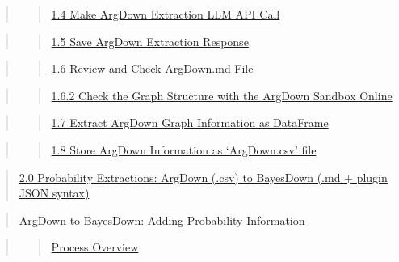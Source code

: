 \documentclass[
  letterpaper,
]{book}
\begin{document}
\begin{quote}
\begin{quote}
\hyperref[scrollTo=i5xsDYnsAWC4]{1.4 Make ArgDown Extraction LLM API
Call}
\end{quote}
\end{quote}

\begin{quote}
\begin{quote}
\hyperref[scrollTo=Lc2nMp8nAfeU]{1.5 Save ArgDown Extraction Response}
\end{quote}
\end{quote}

\begin{quote}
\begin{quote}
\hyperref[scrollTo=5HcCfqE4A0ht]{1.6 Review and Check ArgDown.md File}
\end{quote}
\end{quote}

\begin{quote}
\begin{quote}
\hyperref[scrollTo=gSpkvLbCC_PI]{1.6.2 Check the Graph Structure with
the ArgDown Sandbox Online}
\end{quote}
\end{quote}

\begin{quote}
\begin{quote}
\hyperref[scrollTo=MAm0UKpeBvyr]{1.7 Extract ArgDown Graph Information
as DataFrame}
\end{quote}
\end{quote}

\begin{quote}
\begin{quote}
\hyperref[scrollTo=iFC6oiyICREn]{1.8 Store ArgDown Information as
`ArgDown.csv' file}
\end{quote}
\end{quote}

\begin{quote}
\hyperref[scrollTo=7SGB0XMp5VFq]{2.0 Probability Extractions: ArgDown
(.csv) to BayesDown (.md + plugin JSON syntax)}
\end{quote}

\begin{quote}
\hyperref[scrollTo=hWkmySZYNtzS]{ArgDown to BayesDown: Adding
Probability Information}
\end{quote}

\begin{quote}
\begin{quote}
\hyperref[scrollTo=hWkmySZYNtzS]{Process Overview}
\end{quote}
\end{quote}
\end{document}
